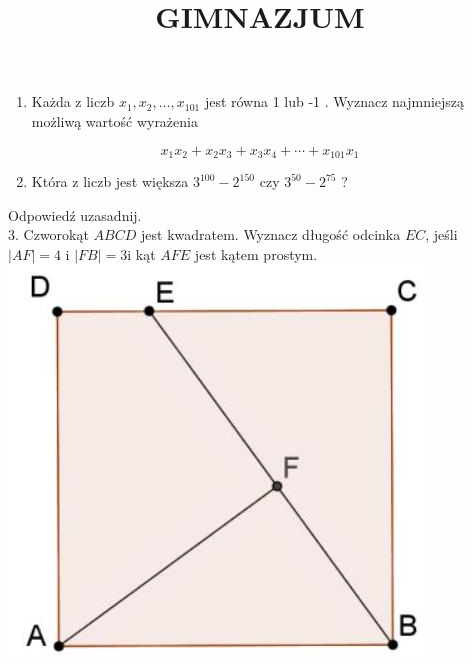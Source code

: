 \documentclass[10pt]{article}
\title{GIMNAZJUM }
\author{}
\date{}
\begin{document}
\maketitle
\begin{enumerate}
  \item Każda z liczb \(x_{1}, x_{2}, \ldots, x_{101}\) jest równa 1 lub -1 . Wyznacz najmniejszą możliwą wartość wyrażenia
\end{enumerate}

\[
x_{1} x_{2}+x_{2} x_{3}+x_{3} x_{4}+\cdots+x_{101} x_{1}
\]

\begin{enumerate}
  \setcounter{enumi}{1}
  \item Która z liczb jest większa \(3^{100}-2^{150}\) czy \(3^{50}-2^{75}\) ?
\end{enumerate}

Odpowiedź uzasadnij.\\
3. Czworokąt \(A B C D\) jest kwadratem. Wyznacz długość odcinka \(E C\), jeśli \(|A F|=4\) i \(|F B|=3 \mathrm{i}\) kąt \(A F E\) jest kątem prostym.\\
\includegraphics[max width=\textwidth, center]{2024_11_21_e8106a0b3aefeaed866dg-1}
\end{document}
